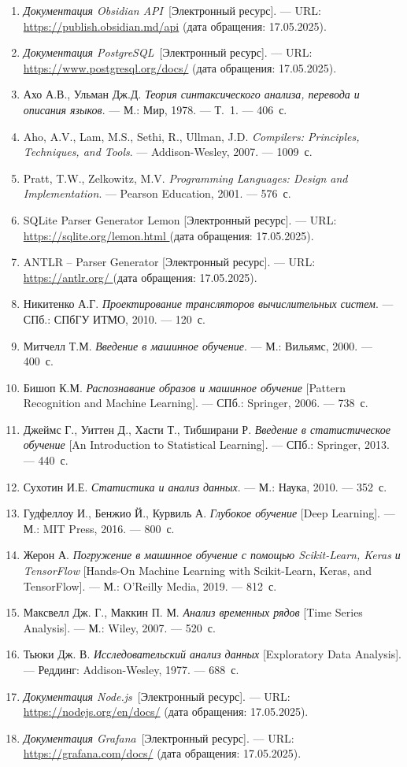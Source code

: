 \documentclass[14pt]{extarticle}
\begin{document}
\begin{enumerate}

\item \textit{Документация Obsidian API}~[Электронный ресурс]. — URL: \url{https://publish.obsidian.md/api} (дата обращения: 17.05.2025).

\item \textit{Документация PostgreSQL}~[Электронный ресурс]. — URL: \url{https://www.postgresql.org/docs/} (дата обращения: 17.05.2025).
\item Ахо А.В., Ульман Дж.Д. \textit{Теория синтаксического анализа, перевода и описания языков}. — М.: Мир, 1978. — Т.~1. — 406~с.
\item Aho, A.V., Lam, M.S., Sethi, R., Ullman, J.D. \textit{Compilers: Principles, Techniques, and Tools}. — Addison-Wesley, 2007. — 1009~с.
\item Pratt, T.W., Zelkowitz, M.V. \textit{Programming Languages: Design and Implementation}. — Pearson Education, 2001. — 576~с.
\item SQLite Parser Generator Lemon [Электронный ресурс]. — URL: \url{https://sqlite.org/lemon.html } (дата обращения: 17.05.2025).
\item ANTLR – Parser Generator [Электронный ресурс]. — URL: \url{https://antlr.org/ } (дата обращения: 17.05.2025).

\item Никитенко А.Г. \textit{Проектирование трансляторов вычислительных систем}. — СПб.: СПбГУ ИТМО, 2010. — 120~с.
\item Митчелл Т.М. \textit{Введение в машинное обучение}. — М.: Вильямс, 2000. — 400~с.
\item Бишоп К.М. \textit{Распознавание образов и машинное обучение} [Pattern Recognition and Machine Learning]. — СПб.: Springer, 2006. — 738~с.
\item Джеймс Г., Уиттен Д., Хасти Т., Тибширани Р. \textit{Введение в статистическое обучение} [An Introduction to Statistical Learning]. — СПб.: Springer, 2013. — 440~с.
\item Сухотин И.Е. \textit{Статистика и анализ данных}. — М.: Наука, 2010. — 352~с.
\item Гудфеллоу И., Бенжио Й., Курвиль А. \textit{Глубокое обучение} [Deep Learning]. — М.: MIT Press, 2016. — 800~с.
\item Жерон А. \textit{Погружение в машинное обучение с помощью Scikit-Learn, Keras и TensorFlow} [Hands-On Machine Learning with Scikit-Learn, Keras, and TensorFlow]. — М.: O'Reilly Media, 2019. — 812~с.
\item Максвелл Дж. Г., Маккин П. М. \textit{Анализ временных рядов} [Time Series Analysis]. — М.: Wiley, 2007. — 520~с.
\item Тьюки Дж. В. \textit{Исследовательский анализ данных} [Exploratory Data Analysis]. — Реддинг: Addison-Wesley, 1977. — 688~с.

\item \textit{Документация Node.js}~[Электронный ресурс]. — URL: \url{https://nodejs.org/en/docs/} (дата обращения: 17.05.2025).
\item \textit{Документация Grafana}~[Электронный ресурс]. — URL: \url{https://grafana.com/docs/} (дата обращения: 17.05.2025).


\end{enumerate}
\end{document}
